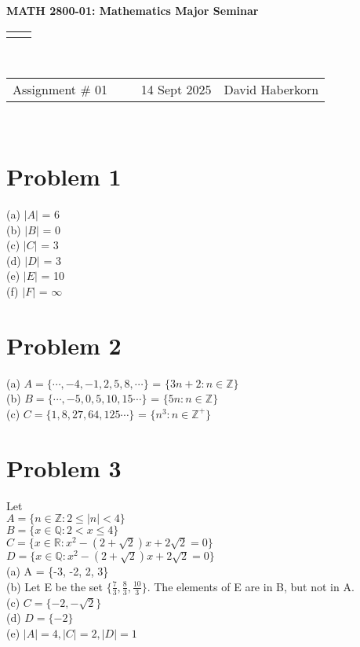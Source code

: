 \documentclass[11pt]{article}
\renewcommand{\title}[1]{\textbf{#1}\\}
\renewcommand{\line}{\begin{tabularx}{\textwidth}{X>{\raggedleft}X}\hline\\\end{tabularx}\\[-0.5cm]}
\newcommand{\leftright}[2]{\begin{tabularx}{\textwidth}{X>{\raggedleft}X}#1%
& #2\\\end{tabularx}\\[-0.5cm]}
\begin{document}
\title{MATH 2800-01: Mathematics Major Seminar}
\line
\leftright{Assignment \# 01 ~~~~ 14 Sept 2025}{David Haberkorn}


\section*{Problem 1}

(a) \space $ |A| $ = 6 \\
(b) \space $ |B| $ = 0 \\
(c) \space $ |C| $ = 3 \\
(d)	\space $ |D| $ = 3 \\
(e) \space $ |E| $ = 10 \\
(f) \space $ |F| $ = $ \infty $ \\


\section*{Problem 2}

(a) \space $ A = \{\cdots, -4, -1, 2, 5, 8, \cdots\} $ = $ \{3n + 2 : n \in \mathbb{Z}\} $ \\
(b) \space $ B = \{\cdots, -5, 0, 5, 10, 15 \cdots\} $ = $ \{5n : n \in \mathbb{Z}\} $ \\
(c) \space $ C = \{ 1, 8, 27, 64, 125 \cdots\} $ = $ \{n^3 : n \in \mathbb{Z}^+\} $ \\


\section*{Problem 3}

Let \\
$ A = \{n \in \mathbb{Z} : 2 \leq |n| < 4\} $ \\
$ B = \{x \in \mathbb{Q} : 2 < x \leq 4\} $ \\
$ C = \{x \in \mathbb{R} : x^2 - (2+\sqrt{2})x + 2\sqrt2 = 0\} $ \\ 
$ D = \{x \in \mathbb{Q} : x^2 - (2+\sqrt{2})x + 2\sqrt2 = 0\} $ \\

(a) \space A = \{-3, -2, 2, 3\} \\
(b) \space Let E be the set $ \{\frac{7}{3}, \frac{8}{3}, \frac{10}{3}\} $. The elements of E are in B, but not in A. \\
(c) \space $ C = \{-2, -\sqrt2\} $ \\
(d) \space $ D = \{-2\} $ \\
(e) \space $ |A| = 4, |C| = 2, |D| = 1 $
\end{document}
